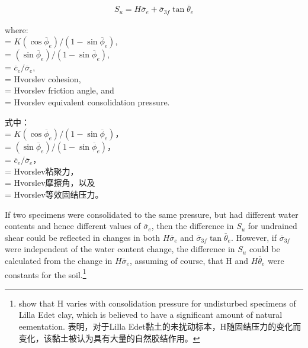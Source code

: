 \begin{align}
    S_u=H\overline{\sigma}_e+\overline{\sigma}_{3f}\tan\overline{\theta}_e
    \label{equation:2}
\end{align}

\begin{paracol}{2}

    \noindent{}where:\\
    \newlength\length
     = $K(\cos\overline{\phi}_e)/(1-\sin\overline{\phi}_e)$, \\
     = $(\sin\overline{\phi}_e)/(1-\sin\overline{\phi}_e)$, \\
     = $\overline{c}_e/\overline{\sigma}_e$, \\
     = Hvorslev cohesion, \\
     = Hvorslev friction angle, and \\
     = Hvorslev equivalent consolidation pressure. 

    \switchcolumn

    \noindent{}式中：\\
     = $K(\cos\overline{\phi}_e)/(1-\sin\overline{\phi}_e)$， \\
     = $(\sin\overline{\phi}_e)/(1-\sin\overline{\phi}_e)$，\\
     = $\overline{c}_e/\overline{\sigma}_e$， \\
     = Hvorslev粘聚力， \\
     = Hvorslev摩擦角，以及 \\
     = Hvorslev等效固结压力。

    \switchcolumn*

    \noindent{}If two specimens were consolidated to the same pressure, but had different water contents and hence different values of $\overline{\sigma}_e$, then the difference in $S_u$ for undrained shear could be reflected in changes in both $H\overline{\sigma}_e$ and $\overline{\sigma}_{3f}\tan\overline{\theta}_e$. However, if $\overline{\sigma}_{3f}$ were independent of the water content change, the difference in $S_u$ could be calculated from the change in $H\overline{\sigma}_e$, assuming of course, that H and $H\overline{\theta}_e$ were constants for the soil.\footnote{
        \citet{Bjerrum1960101} show that H varies with consolidation pressure for undisturbed specimens of Lilla Edet clay, which is believed to have a significant amount of natural eementation. \citet{Bjerrum1960101}表明，对于Lilla Edet黏土的未扰动标本，H随固结压力的变化而变化，该黏土被认为具有大量的自然胶结作用。
    }


\end{paracol}
